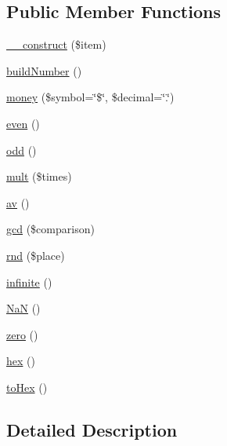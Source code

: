 \subsection*{Public Member Functions}
\begin{DoxyCompactItemize}
\item 
\hyperlink{class_pierce_moore_1_1_ruby_p_h_p_1_1r_number_a4b0c1fe0e6c94ec2df5006f414b164c4}{\-\_\-\-\_\-construct} (\$item)
\item 
\hyperlink{class_pierce_moore_1_1_ruby_p_h_p_1_1r_number_a686a6d6caa2f0a26bede859f3d180c83}{build\-Number} ()
\item 
\hyperlink{class_pierce_moore_1_1_ruby_p_h_p_1_1r_number_a7755db2baa1c58774d9cf1c5c82676a1}{money} (\$symbol=\char`\"{}\$\char`\"{}, \$decimal=\char`\"{}.\char`\"{})
\item 
\hyperlink{class_pierce_moore_1_1_ruby_p_h_p_1_1r_number_a046b5f5e8b171d4724f2780303239825}{even} ()
\item 
\hyperlink{class_pierce_moore_1_1_ruby_p_h_p_1_1r_number_a666c4ea82d473f0e68ad97e3f33d1e83}{odd} ()
\item 
\hyperlink{class_pierce_moore_1_1_ruby_p_h_p_1_1r_number_a57202f5e3d5e0a89e18aac7d96773cab}{mult} (\$times)
\item 
\hyperlink{class_pierce_moore_1_1_ruby_p_h_p_1_1r_number_ad8c557c876471daa5dce718f01fd77b2}{av} ()
\item 
\hyperlink{class_pierce_moore_1_1_ruby_p_h_p_1_1r_number_a0a13d13bfe0866bab479a700d059898b}{gcd} (\$comparison)
\item 
\hyperlink{class_pierce_moore_1_1_ruby_p_h_p_1_1r_number_ab7cf083b6111db8f56b7d0b42cbba7a0}{rnd} (\$place)
\item 
\hyperlink{class_pierce_moore_1_1_ruby_p_h_p_1_1r_number_a63f86e65e715320e6e292251810cd0b9}{infinite} ()
\item 
\hyperlink{class_pierce_moore_1_1_ruby_p_h_p_1_1r_number_ae27ea99fd73ded7a863a154be23756d3}{Na\-N} ()
\item 
\hyperlink{class_pierce_moore_1_1_ruby_p_h_p_1_1r_number_a75525252dfe9a4b2cc4e31bf066afe1c}{zero} ()
\item 
\hyperlink{class_pierce_moore_1_1_ruby_p_h_p_1_1r_number_a0c6f82bc490087648b9f1fef553e05eb}{hex} ()
\item 
\hyperlink{class_pierce_moore_1_1_ruby_p_h_p_1_1r_number_a59e26fcd3f578f30737550623859abe7}{to\-Hex} ()
\end{DoxyCompactItemize}


\subsection{Detailed Description}


